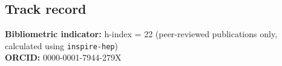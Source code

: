 \documentclass[a4paper,11pt]{article}
\begin{document}

\newpage

\subsection{Track record}

\vspace{0.2cm}


\textbf{Bibliometric indicator:} h-index = 22 (peer-reviewed publications only, calculated using \texttt{inspire-hep}) \\
\textbf{ORCID:} 0000-0001-7944-279X

\vspace{0.3cm}
\end{document}
